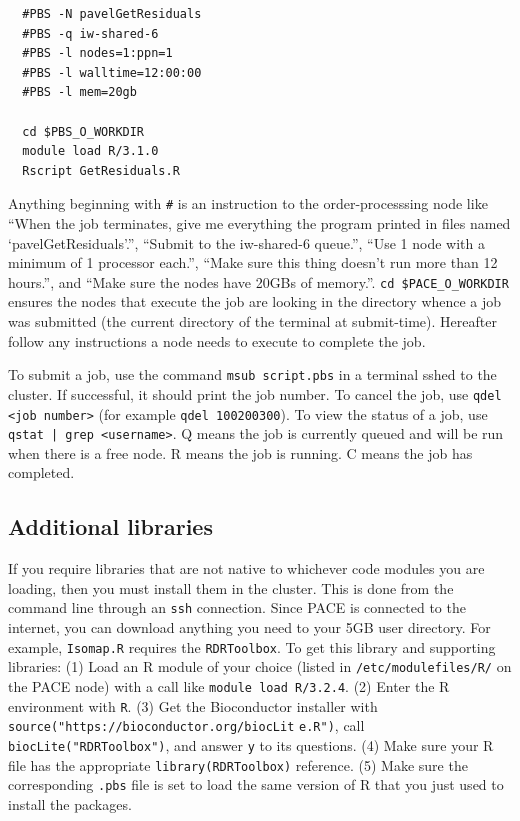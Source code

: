 \documentclass[]{article}
\begin{document}
  \begin{verbatim}
  #PBS -N pavelGetResiduals
  #PBS -q iw-shared-6
  #PBS -l nodes=1:ppn=1
  #PBS -l walltime=12:00:00
  #PBS -l mem=20gb

  cd $PBS_O_WORKDIR
  module load R/3.1.0
  Rscript GetResiduals.R
  \end{verbatim}

  \vspace{-3mm}
  Anything beginning with \texttt{\#} is an instruction to the order-processsing node like ``When the job terminates, give me everything the program printed in files named `pavelGetResiduals'.'', ``Submit to the iw-shared-6 queue.'', ``Use 1 node with a minimum of 1 processor each.'', ``Make sure this thing doesn't run more than 12 hours.'', and ``Make sure the nodes have 20GBs of memory.''. \texttt{cd \$PACE\_O\_WORKDIR} ensures the nodes that execute the job are looking in the directory whence a job was submitted (the current directory of the terminal at submit-time). Hereafter follow any instructions a node needs to execute to complete the job.

  To submit a job, use the command \texttt{msub script.pbs} in a terminal sshed to the cluster. If successful, it should print the job number. To cancel the job, use \texttt{qdel <job number>} (for example \texttt{qdel 100200300}). To view the status of a job, use \texttt{qstat | grep <username>}. Q means the job is currently queued and will be run when there is a free node. R means the job is running. C means the job has completed.

  \subsection{Additional libraries} \label{adlib}
  If you require libraries that are not native to whichever code modules you are loading, then you must install them in the cluster. This is done from the command line through an \texttt{ssh} connection. Since PACE is connected to the internet, you can download anything you need to your 5GB user directory. For example, \texttt{Isomap.R} requires the \texttt{RDRToolbox}. To get this library and supporting libraries: (1) Load an R module of your choice (listed in \texttt{/etc/modulefiles/R/} on the PACE node) with a call like \texttt{module load R/3.2.4}. (2) Enter the R environment with \texttt{R}. (3) Get the Bioconductor installer with \texttt{source("https://bioconductor.org/biocLit} \texttt{e.R")}, call \texttt{biocLite("RDRToolbox")}, and answer \texttt{y} to its questions. (4) Make sure your R file has the appropriate \texttt{library(RDRToolbox)} reference. (5) Make sure the corresponding \texttt{.pbs} file is set to load the same version of R that you just used to install the packages.
\end{document}
